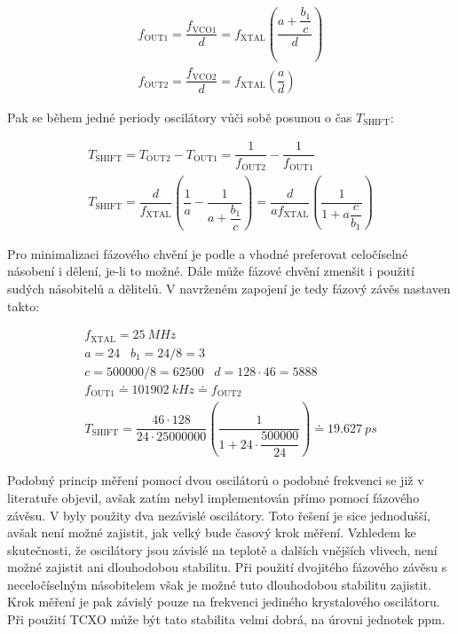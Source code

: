 \begin{equation}
\begin{gathered}
f_\mathrm{OUT1}=\dfrac{f_\mathrm{VCO1}}{d}=f_\mathrm{XTAL} \left(\dfrac{a+\dfrac{b_1}{c} }{d}\right) \\
f_\mathrm{OUT2}=\dfrac{f_\mathrm{VCO2}}{d}=f_\mathrm{XTAL} \left(\dfrac{a}{d}\right)
\end{gathered}
\end{equation}

Pak se během jedné periody oscilátory vůči sobě posunou o čas $T_\textrm{SHIFT}$:

\begin{equation}
\begin{gathered}
T_\mathrm{SHIFT}=T_\mathrm{OUT2}-T_\mathrm{OUT1}=\dfrac{1}{f_\mathrm{OUT2}} - \dfrac{1}{f_\mathrm{OUT1}} \\
T_\mathrm{SHIFT}=\dfrac{d}{f_\mathrm{XTAL}} \left(\dfrac{1}{a} - \dfrac{1}{a+\dfrac{b_1}{c}}\right) = \dfrac{d}{a f_\mathrm{XTAL}} \left(\dfrac{1}{1+a\dfrac{c}{b_1}}\right)
\end{gathered}
\label{equation_tshift}
\end{equation}

Pro minimalizaci fázového chvění je podle \cite{Si5351datasheet} a \cite{Si5351applicationnote} vhodné preferovat celočíselné násobení i dělení, je-li to možné. Dále může fázové chvění zmenšit i použití sudých násobitelů a dělitelů. V navrženém zapojení je tedy fázový závěs nastaven takto:

\begin{equation}
\begin{gathered}
f_\mathrm{XTAL}=\SI{25}{MHz} \\
a=24 \;\;\; b_1=24/8=3 \\
c=500000/8=62500 \;\;\; d=128 \cdot 46=5888 \\
f_\mathrm{OUT1} \doteq \SI{101902}{kHz} \doteq f_\mathrm{OUT2} \\
T_\mathrm{SHIFT} = \dfrac{46 \cdot 128}{24 \cdot 25000000} \left(\dfrac{1}{1+24 \cdot \dfrac{500000}{24}}\right) \doteq \SI{19.627}{ps}
\end{gathered}
\end{equation}

Podobný princip měření pomocí dvou oscilátorů o podobné frekvenci se již v literatuře objevil, avšak zatím nebyl implementován přímo pomocí fázového závěsu. V \cite{vernierreflectometer} byly použity dva nezávislé oscilátory. Toto řešení je sice jednodušší, avšak není možné zajistit, jak velký bude časový krok měření. Vzhledem ke skutečnosti, že oscilátory jsou závislé na teplotě a dalších vnějších vlivech, není možné zajistit ani dlouhodobou stabilitu. Při použití dvojitého fázového závěsu s neceločíselným násobitelem však je možné tuto dlouhodobou stabilitu zajistit. Krok měření je pak závislý pouze na frekvenci jediného krystalového oscilátoru. Při použití \acrshort{TCXO} může být tato stabilita velmi dobrá, na úrovni jednotek \si{ppm}.

